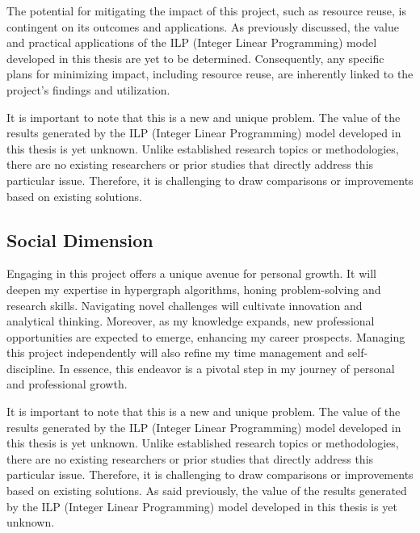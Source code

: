 The potential for mitigating the impact of this project, such as resource reuse, is contingent on its outcomes and applications. As previously discussed, the value and practical applications of the ILP (Integer Linear Programming) model developed in this thesis are yet to be determined. Consequently, any specific plans for minimizing impact, including resource reuse, are inherently linked to the project's findings and utilization.


It is important to note that this is a new and unique problem. The value of the results generated by the ILP (Integer Linear Programming) model developed in this thesis is yet unknown. Unlike established research topics or methodologies, there are no existing researchers or prior studies that directly address this particular issue. Therefore, it is challenging to draw comparisons or improvements based on existing solutions.

\subsection{Social Dimension}
Engaging in this project offers a unique avenue for personal growth. It will deepen my expertise in hypergraph algorithms, honing problem-solving and research skills. Navigating novel challenges will cultivate innovation and analytical thinking. Moreover, as my knowledge expands, new professional opportunities are expected to emerge, enhancing my career prospects. Managing this project independently will also refine my time management and self-discipline. In essence, this endeavor is a pivotal step in my journey of personal and professional growth.

It is important to note that this is a new and unique problem. The value of the results generated by the ILP (Integer Linear Programming) model developed in this thesis is yet unknown. Unlike established research topics or methodologies, there are no existing researchers or prior studies that directly address this particular issue. Therefore, it is challenging to draw comparisons or improvements based on existing solutions.
As said previously, the value of the results generated by the ILP (Integer Linear Programming) model developed in this thesis is yet unknown.